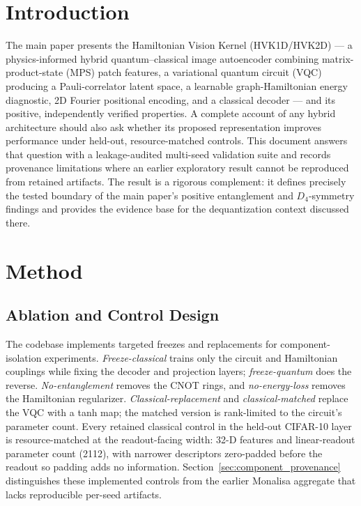 \documentclass[11pt]{article}
\begin{document}
\section{Introduction}
The main paper presents the Hamiltonian Vision Kernel (HVK1D/HVK2D) --- a physics-informed hybrid quantum--classical image autoencoder combining matrix-product-state (MPS) patch features, a variational quantum circuit (VQC) producing a Pauli-correlator latent space, a learnable graph-Hamiltonian energy diagnostic, 2D Fourier positional encoding, and a classical decoder --- and its positive, independently verified properties. A complete account of any hybrid architecture should also ask whether its proposed representation improves performance under held-out, resource-matched controls. This document answers that question with a leakage-audited multi-seed validation suite and records provenance limitations where an earlier exploratory result cannot be reproduced from retained artifacts. The result is a rigorous complement: it defines precisely the tested boundary of the main paper's positive entanglement and $D_4$-symmetry findings and provides the evidence base for the dequantization context discussed there.

\section{Method}

\subsection{Ablation and Control Design}
The codebase implements targeted freezes and replacements for component-isolation experiments. \emph{Freeze-classical} trains only the circuit and Hamiltonian couplings while fixing the decoder and projection layers; \emph{freeze-quantum} does the reverse. \emph{No-entanglement} removes the CNOT rings, and \emph{no-energy-loss} removes the Hamiltonian regularizer. \emph{Classical-replacement} and \emph{classical-matched} replace the VQC with a tanh map; the matched version is rank-limited to the circuit's parameter count. Every retained classical control in the held-out CIFAR-10 layer is resource-matched at the readout-facing width: 32-D features and linear-readout parameter count (2112), with narrower descriptors zero-padded before the readout so padding adds no information. Section~\ref{sec:component_provenance} distinguishes these implemented controls from the earlier Monalisa aggregate that lacks reproducible per-seed artifacts.
\end{document}
